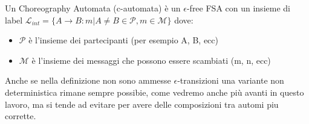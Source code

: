 \begin{definition}
    Un Choreography Automata (c-automata) è un $\epsilon$-free FSA con un insieme di label $\mathcal{L}_{int} = \{ A \rightarrow B : m | A \neq B \in \mathcal{P}, m \in \mathcal{M} \}$ dove:
    \begin{itemize}
        \item $\mathcal{P}$ è l'insieme dei partecipanti (per esempio A, B, ecc)
        \item $\mathcal{M}$ è l'insieme dei messaggi che possono essere scambiati (m, n, ecc)
    \end{itemize}
\end{definition}
\begin{remark}
    Anche se nella definizione non sono ammesse $\epsilon$-transizioni una variante non deterministica rimane sempre possibie, come vedremo anche più avanti in questo lavoro, ma si tende ad evitare per avere delle composizioni tra automi piu corrette.
\end{remark}